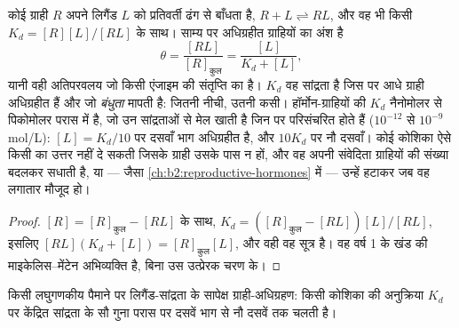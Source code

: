 \begin{theorem}[ग्राही-अधिग्रहण]\label{thm:b2:cell-signalling:occupancy}
कोई ग्राही $R$ अपने लिगैंड $L$ को प्रतिवर्ती ढंग से बाँधता है, $R + L
\rightleftharpoons RL$, और वह भी किसी \emph{} $K_d =
[R][L]/[RL]$ के साथ। साम्य पर अधिग्रहीत ग्राहियों का अंश है
\[
\theta = \frac{[RL]}{[R]_{\text{कुल}}} = \frac{[L]}{K_d + [L]},
\]
यानी वही अतिपरवलय जो किसी एंजाइम की संतृप्ति का है। $K_d$ वह
सांद्रता है जिस पर आधे ग्राही अधिग्रहीत हैं और जो
\emph{बंधुता} मापती है: जितनी नीची, उतनी कसी। हॉर्मोन-ग्राहियों की
$K_d$ नैनोमोलर से पिकोमोलर परास में है, जो उन
सांद्रताओं से मेल खाती है जिन पर  परिसंचरित होते हैं ($10^{-12}$ से
$10^{-9}$ mol/L): $[L] = K_d/10$ पर दसवाँ भाग अधिग्रहीत है, और
$10K_d$ पर नौ दसवाँ। कोई कोशिका ऐसे किसी  का उत्तर नहीं दे सकती जिसके
ग्राही उसके पास न हों, और वह अपनी संवेदिता ग्राहियों की
संख्या बदलकर सधाती है, या --- जैसा \cref{ch:b2:reproductive-hormones} में ---
उन्हें हटाकर जब वह  लगातार मौजूद हो।
\end{theorem}
\begin{proof}
$[R] = [R]_{\text{कुल}} - [RL]$ के साथ, $K_d = ([R]_{\text{कुल}} -
[RL])[L]/[RL]$, इसलिए $[RL](K_d + [L]) = [R]_{\text{कुल}}[L]$, और वही
वह सूत्र है। वह वर्ष 1 के खंड की माइकेलिस--मेंटेन अभिव्यक्ति है,
बिना उस उत्प्रेरक चरण के।
\end{proof}

\begin{omfigure}

{\small किसी लघुगणकीय पैमाने पर लिगैंड-सांद्रता के सापेक्ष
ग्राही-अधिग्रहण: किसी कोशिका की अनुक्रिया $K_d$ पर केंद्रित सांद्रता के
सौ गुना परास पर दसवें भाग से नौ दसवें तक चलती है।}
\end{omfigure}

